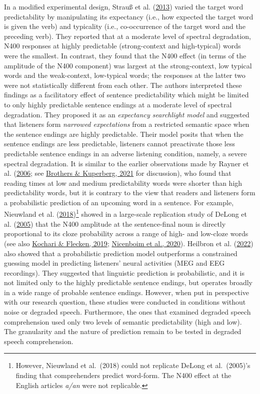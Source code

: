 \documentclass[a4paper, nobind]{templates/ociamthesis}
\begin{document}
In a modified experimental design, Strauß et al. (\protect\hyperlink{ref-Strauss2013}{2013}) varied the target word predictability by manipulating its expectancy (i.e., how expected the target word is given the verb) and typicality (i.e., co-occurrence of the target word and the preceding verb).
They reported that at a moderate level of spectral degradation, N400 responses at highly predictable (strong-context and high-typical) words were the smallest.
In contrast, they found that the N400 effect (in terms of the amplitude of the N400 component) was largest at the strong-context, low typical words and the weak-context, low-typical words;
the responses at the latter two were not statistically different from each other.
The authors interpreted these findings as a facilitatory effect of sentence predictability which might be limited to only highly predictable sentence endings at a moderate level of spectral degradation.
They proposed it as an \emph{expectancy searchlight model} and suggested that listeners form \emph{narrowed expectations} from a restricted semantic space when the sentence endings are highly predictable.
Their model posits that when the sentence endings are less predictable, listeners cannot preactivate those less predictable sentence endings in an adverse listening condition, namely, a severe spectral degradation.
It is similar to the earlier observations made by Rayner et al. (\protect\hyperlink{ref-Rayner2006}{2006}; see \protect\hyperlink{ref-Brothers2021}{Brothers \& Kuperberg, 2021} for discussion), who found that reading times at low and medium predictability words were shorter than high predictability words,
but it is contrary to the view that readers and listeners form a probabilistic prediction of an upcoming word in a sentence.
For example, Nieuwland et al. (\protect\hyperlink{ref-Nieuwland2018}{2018})\footnote{However, Nieuwland et al.~(2018) could not replicate DeLong et al.~(2005)'s finding that comprehenders predict word-form. The N400 effect at the English articles \emph{a/an} were not replicable.} showed in a large-scale replication study of DeLong et al. (\protect\hyperlink{ref-Delong2005}{2005}) that the N400 amplitude at the sentence-final noun is directly proportional to its cloze probability across a range of high- and low-cloze words (see also \protect\hyperlink{ref-Kochari2019}{Kochari \& Flecken, 2019}; \protect\hyperlink{ref-Nicenboim2020}{Nicenboim et al., 2020}).
Heilbron et al. (\protect\hyperlink{ref-Heilbron2022}{2022}) also showed that a probabilistic prediction model outperforms a constrained guessing model in predicting listeners' neural activities (MEG and EEG recordings).
They suggested that linguistic prediction is probabilistic, and it is not limited only to the highly predictable sentence endings, but operates broadly in a wide range of probable sentence endings.
However, when put in perspective with our research question, these studies were conducted in conditions without noise or degraded speech.
Furthermore, the ones that examined degraded speech comprehension used only two levels of semantic predictability (high and low).
The granularity and the nature of prediction remain to be tested in degraded speech comprehension.
\end{document}
